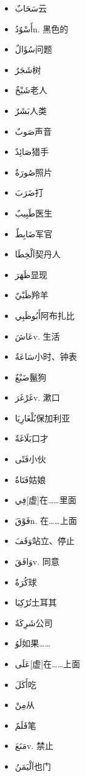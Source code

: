 \begin{itemize}
    \item {} \ac{سَحَابٌ}{云}
    \item \ac{أَسْوٌدُ}{n. 黑色的}
    \item \ac{سُؤَالٌ}{问题}
    \item \ac{شَجَرٌ}{树}
    \item \ac{شَبْخٌ}{老人}
    \item \ac{بَشَرٌ}{人类}
    \item \ac{صَوبٌ}{声音}
    \item \ac{صَائِدٌ}{猎手}
    \item \ac{صُورَةٌ}{照片}
    \item \ac{ضَرَبَ}{打}
    \item \ac{طَبِيبٌ}{医生}
    \item \ac{ضَابِطٌ}{军官}
    \item \ac{اَلْخِطَا}{契丹人}
    \item \ac{ظَهَرَ}{显现}
    \item \ac{ظَبْيٌ}{羚羊}
    \item \ac{أَبُوظَبِي}{阿布扎比}
    \item \ac{عَاشَ}{v. 生活}
    \item \ac{سَاعَةٌ}{小时、钟表}
    \item \ac{ضَبْعٌ}{鬣狗}
    \item \ac{غَرْغَرَ}{v. 漱口}
    \item \ac{بُلْغَارِيَا}{保加利亚}
    \item \ac{بَلَاغَةٌ}{口才}
    
    \item {} \ac{فَتًى}{小伙}
    \item \ac{فَتَاةٌ}{姑娘}
    \item \ac{فِي}{[虚]在……里面}
    \item \ac{فَوْقَ}{n. 在……上面}
    \item \ac{وَقَفَ}{站立、停止}
    \item \ac{وَافَقَ}{v. 同意}
    \item \ac{كُرَةٌ}{球}
    \item \ac{تُرْكِيَا}{土耳其}
    \item \ac{شَرِكَةٌ}{公司}
    \item \ac{لَوُ}{如果……}
    \item \ac{عَلَى}{[虚]在……上面}
    \item \ac{أَكَلَ}{吃}
    \item \ac{مِنْ}{从}
    \item \ac{قَلَمٌ}{笔}
    \item \ac{مَنَعَ}{v. 禁止}
    \item \ac{اَلْيَمَنُ}{也门}
\end{itemize}

